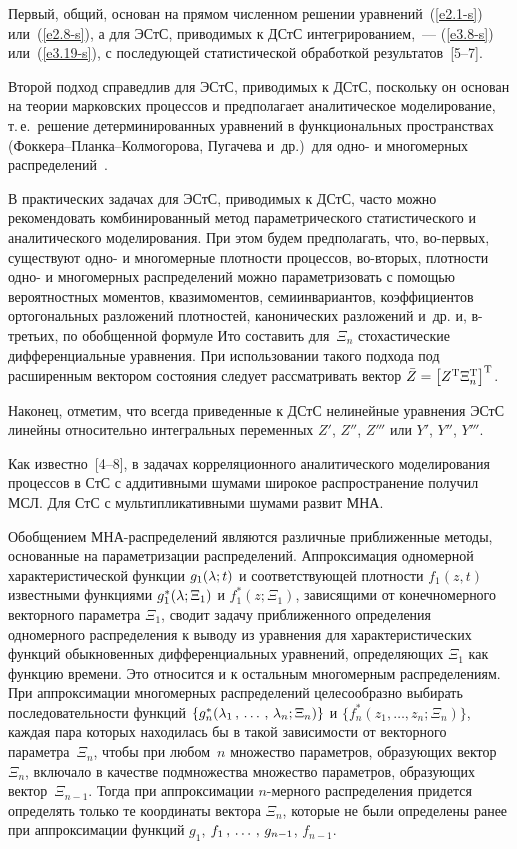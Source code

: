 \begin{multicols}{2}
Первый, общий, основан на прямом численном решении уравнений~(\ref{e2.1-s}) или~(\ref{e2.8-s}), 
а для ЭСтС, приводимых к ДСтС интегрированием,~--- (\ref{e3.8-s}) или~(\ref{e3.19-s}), 
с последующей статистической обработкой результатов~[5--7].

Второй подход справедлив для ЭСтС, приводимых к ДСтС, поскольку он основан на 
теории марковских процессов и предполагает аналитическое моделирование, т.\,е.\ 
решение детерминированных уравнений в функциональных пространствах 
(Фок\-ке\-ра--План\-ка--Кол\-мо\-го\-ро\-ва, Пугачева и~др.)\ 
для одно- и многомерных распределений~\cite{5-s, 6-s}.

В практических задачах для ЭСтС, приводимых к ДСтС, часто можно рекомендовать 
комбинированный метод параметрического статистического и аналитического моделирования. 
При этом будем предполагать, что, во-пер\-вых, существуют одно- и многомерные плотности 
процессов, во-вто\-рых, плотности одно- и многомерных распределений можно параметризовать 
с помощью вероятностных моментов, квазимоментов, семиинвариантов, коэффициентов ортогональных 
разложений плотностей, канонических разложений и~др. и, в-третьих, по обобщенной 
формуле Ито составить для~$\Xi_n$ стохастические дифференциальные уравнения. 
При использовании такого подхода под расширенным вектором состояния следует 
рассматривать вектор $\bar Z\hm= \lk Z^{\mathrm{T}}  \Xi_n^{\mathrm{T}}\rk^{\mathrm{T}}$.

Наконец, отметим, что всегда приведенные к ДСтС нелинейные уравнения ЭСтС 
линейны относительно интегральных переменных $Z'$, $Z''$, $Z'''$ или $Y'$, $Y''$, $Y'''$.

Как известно~[4--8], в задачах корреляционного аналитического моделирования процессов в 
СтС с аддитивными шумами широкое распространение получил МСЛ. 
Для СтС с мультипликативными шумами развит МНА.

Обобщением МНА-рас\-пре\-де\-ле\-ний являются различные
приближенные методы, основанные на параметризации распределений.
Аппроксимация одномерной характеристической функции $g_1 (\lambda;t)$
и соответствующей плотности $f_1 (z,t)$ известными функциями
$g_1^* (\lambda;\Xi_1)$ и $f_1^* (z;\Xi_1)$, зависящими от
конечномерного векторного параметра $\Xi_1$,  сводит задачу
приближенного определения одномерного распределения к выводу из
уравнения для характеристических функций обыкновенных
дифференциальных уравнений, определяющих $\Xi_1$ как функцию
времени. Это относится и к остальным многомерным распределениям.
При аппроксимации многомерных распределений целесообразно выбирать
последовательности функций $\{g_n^* (\lambda_1\,,\,\ldots\,,\, \lambda_n;\Xi_n)\}$ и
 $\{ f_n^* (z_1,\ldots,z_n;\Xi_n)\}$, каждая пара
которых находилась бы в такой  за\-ви\-си\-мости от векторного параметра~$\Xi_n$, 
чтобы при любом~$n$ множество параметров, образующих
вектор~$\Xi_n$, включало в качестве подмножества множество
параметров, образующих вектор~$\Xi_{n-1}$. Тогда при
аппроксимации $n$-мер\-но\-го распределения придется определять только
те координаты вектора $\Xi_n$, которые не были определены ранее
при аппроксимации функций $g_1$, $f_1\,,\,\ldots\,,\, g_{n-1}$, $f_{n-1}$.


\end{multicols}
